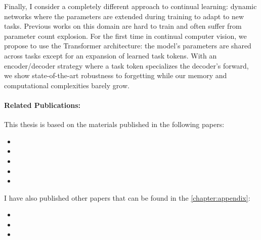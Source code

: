 \begin{itemize}
            Finally, I consider a completely different approach to continual learning: dynamic networks
            where the parameters are extended during training to adapt to new tasks. Previous works on
            this domain are hard to train and often suffer from parameter count explosion. For the
            first time in continual computer vision, we propose to use the Transformer architecture:
            the model's parameters are shared across tasks except for an
            expansion of learned task tokens. With an encoder/decoder strategy where a task token
            specializes the decoder's forward, we show state-of-the-art robustness to forgetting
            while our memory and computational complexities barely grow.
\end{itemize}

\paragraph{Related Publications:} This thesis is based on the materials published in the following papers:

\begin{itemize}
      \item {}
      \item {}
      \item {}
      \item {}
      \item {}
\end{itemize}

I have also published other papers that can be found in the \autoref{chapter:appendix}:

\begin{itemize}
      \item {}
      \item {}
      \item {}
\end{itemize}

